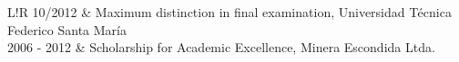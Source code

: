 \documentclass[a4paper, 12]{scrartcl}
\newcommand{\preSectionSpace}{\vspace{0.2cm}}
\newcommand{\afterSectionSpace}{\vspace{0.5cm}}
\newcommand\VRule{\color{lightgray}\vrule width 0.3pt}
\begin{document}
	\preSectionSpace
	\vspace{0.3cm}
	\afterSectionSpace
	
	\begin{tabular}{L!{\VRule}R}
		10/2012 & Maximum distinction in final examination, Universidad Técnica Federico Santa María \\
		2006 - 2012 & Scholarship for Academic Excellence, Minera Escondida Ltda.
	\end{tabular}
	
	\vspace{0.5cm}
	
\end{document}
